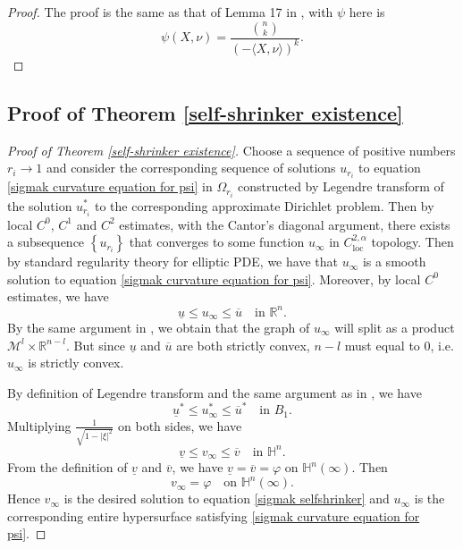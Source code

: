 \documentclass[reqno]{amsart}
\theoremstyle{remark}
\theoremstyle{definition}
\numberwithin{equation}{section}
\begin{document}
\begin{proof}
    The proof is the same as that of Lemma 17 in \cite{Theprescribedcurvatureproblem}, with $\psi$ here is 
    \[
    \psi(X, \nu) = \frac{\binom{n}{k}}{\left( -\langle X, \nu \rangle \right)^k}. 
    \]
\end{proof}


\subsection{Proof of Theorem \ref{self-shrinker existence}}\label{Proof of Theorem 1.1}


\begin{proof}[Proof of Theorem \ref{self-shrinker existence}]
    Choose a sequence of positive numbers $r_i \to 1$ and consider the corresponding sequence of solutions $u_{r_i}$ to equation \eqref{sigmak curvature equation for psi} in $\Omega_{r_i}$ constructed by Legendre transform of the solution $u_{r_i}^*$ to the corresponding approximate Dirichlet problem. Then by local $C^0$, $C^1$ and $C^2$ estimates, with the Cantor's diagonal argument, there exists a subsequence $\left\{ u_{r_i} \right\}$ that converges to some function $u_{\infty}$ in $C^{2,\alpha}_{\mathrm{loc}}$ topology. Then by standard regularity theory for elliptic PDE, we have that $u_{\infty}$ is a smooth solution to equation \eqref{sigmak curvature equation for psi}. 
    Moreover, by local $C^0$ estimates, we have 
    \[
    \underline{u} \leqslant u_{\infty} \leqslant \overline{u} \quad \text{in } \mathbb{R}^n.
    \]
    By the same argument in \cite[Theorem 29]{Entireconstantsigmak}, we obtain that the graph of $u_{\infty}$ will split as a product $\mathcal{M}^l \times \mathbb{R}^{n-l}$. But since $\underline{u}$ and $\overline{u}$ are both strictly convex, $n-l$ must equal to $0$, i.e. $u_{\infty}$ is strictly convex.

    By definition of Legendre transform and the same argument as in \cite[section 6.1]{Entireconstantsigmak}, we have
    \[
    \underline{u}^* \leqslant u_{\infty}^* \leqslant \overline{u}^* \quad \text{in } B_1.
    \]
    Multiplying $\frac{1}{\sqrt{1 - |\xi|^2}}$ on both sides, we have
    \[
    \underline{v} \leqslant v_{\infty} \leqslant \overline{v} \quad \text{in } \mathbb{H}^n.
    \]
    From the definition of $\underline{v}$ and $\overline{v}$, we have $\underline{v} = \overline{v} = \varphi$ on $\mathbb{H}^n(\infty)$. Then 
    \[
    v_{\infty} = \varphi \quad \text{on } \mathbb{H}^n(\infty).
    \]
    Hence $v_{\infty}$ is the desired solution to equation \eqref{sigmak selfshrinker} and $u_{\infty}$ is the corresponding entire hypersurface satisfying \eqref{sigmak curvature equation for psi}.
\end{proof}
\end{document}
